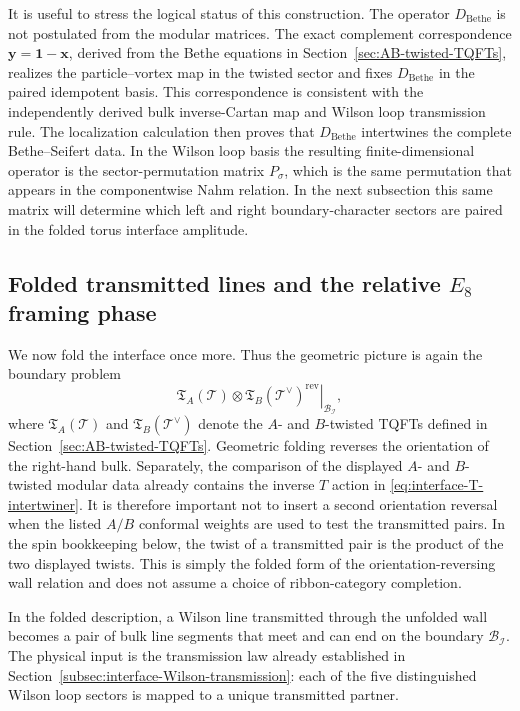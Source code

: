 \documentclass[11pt,a4paper]{article}
\numberwithin{equation}{section}
\begin{document}
It is useful to stress the logical status of this construction.  The operator $D_{\mathrm{Bethe}}$ is not postulated from the modular matrices.  The exact complement correspondence $\boldsymbol y=\boldsymbol1-\boldsymbol x$, derived from the Bethe equations in Section~\ref{sec:AB-twisted-TQFTs}, realizes the particle--vortex map in the twisted sector and fixes $D_{\mathrm{Bethe}}$ in the paired idempotent basis.  This correspondence is consistent with the independently derived bulk inverse-Cartan map and Wilson loop transmission rule.  The localization calculation then proves that $D_{\mathrm{Bethe}}$ intertwines the complete Bethe--Seifert data.  In the Wilson loop basis the resulting finite-dimensional operator is the sector-permutation matrix $P_\sigma$, which is the same permutation that appears in the componentwise Nahm relation.  In the next subsection this same matrix will determine which left and right boundary-character sectors are paired in the folded torus interface amplitude.


\subsection{Folded transmitted lines and the relative $E_8$ framing phase}
\label{subsec:folded-lines-E8-phase}

We now fold the interface once more.  Thus the geometric picture is again the boundary problem
\[
  \left.
  \mathfrak T_A(\mathcal T)\otimes
  \mathfrak T_B(\mathcal T^\vee)^{\mathrm{rev}}
  \right|_{\mathcal B_{\mathcal I}},
\]
where $\mathfrak T_A(\mathcal T)$ and $\mathfrak T_B(\mathcal T^\vee)$ denote the $A$- and $B$-twisted TQFTs defined in Section~\ref{sec:AB-twisted-TQFTs}.  Geometric folding reverses the orientation of the right-hand bulk.  Separately, the comparison of the displayed $A$- and $B$-twisted modular data already contains the inverse $T$ action in \eqref{eq:interface-T-intertwiner}.  It is therefore important not to insert a second orientation reversal when the listed $A/B$ conformal weights are used to test the transmitted pairs.  In the spin bookkeeping below, the twist of a transmitted pair is the product of the two displayed twists.  This is simply the folded form of the orientation-reversing wall relation and does not assume a choice of ribbon-category completion.

In the folded description, a Wilson line transmitted through the unfolded wall becomes a pair of bulk line segments that meet and can end on the boundary $\mathcal B_{\mathcal I}$.  The physical input is the transmission law already established in Section~\ref{subsec:interface-Wilson-transmission}: each of the five distinguished Wilson loop sectors is mapped to a unique transmitted partner.
\end{document}
